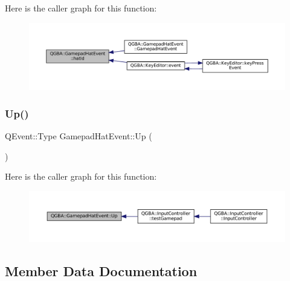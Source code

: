 Here is the caller graph for this function\+:
\nopagebreak
\begin{figure}[H]
\begin{center}
\leavevmode
\includegraphics[width=350pt]{class_q_g_b_a_1_1_gamepad_hat_event_a2128bd4e5dd8a0b9c403c1a67adb092f_icgraph}
\end{center}
\end{figure}
\mbox{\label{class_q_g_b_a_1_1_gamepad_hat_event_a50c86094bbd93339a59b231e38bf15b0}} 
\subsubsection{\texorpdfstring{Up()}{Up()}}
{\footnotesize\ttfamily Q\+Event\+::\+Type Gamepad\+Hat\+Event\+::\+Up (\begin{DoxyParamCaption}{ }\end{DoxyParamCaption})\hspace{0.3cm}{\ttfamily [static]}}

Here is the caller graph for this function\+:
\nopagebreak
\begin{figure}[H]
\begin{center}
\leavevmode
\includegraphics[width=350pt]{class_q_g_b_a_1_1_gamepad_hat_event_a50c86094bbd93339a59b231e38bf15b0_icgraph}
\end{center}
\end{figure}


\subsection{Member Data Documentation}
\mbox{\label{class_q_g_b_a_1_1_gamepad_hat_event_aeb6ae14151d609c2d89d984326af3bf4}} 
